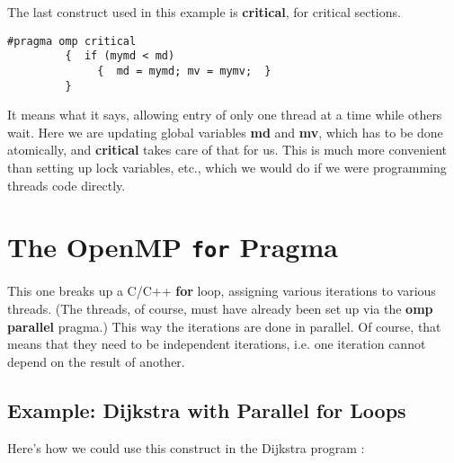 The last construct used in this example is {\bf critical}, for critical
sections.

\begin{Verbatim}[fontsize=\relsize{-2}]
         #pragma omp critical
         {  if (mymd < md)
              {  md = mymd; mv = mymv;  }
         }
\end{Verbatim}

It means what it says, allowing entry of only one thread at a time while
others wait.  Here we are updating global variables {\bf md} and {\bf
mv}, which has to be done atomically, and {\bf critical} takes care of
that for us.  This is much more convenient than setting up lock
variables, etc., which we would do if we were programming threads code
directly.

\section{The OpenMP {\tt for} Pragma}

This one breaks up a C/C++ {\bf for} loop, assigning various iterations
to various threads.  (The threads, of course, must have already been set
up via the {\bf omp parallel} pragma.) This way the iterations are done
in parallel.  Of course, that means that they need to be independent
iterations, i.e. one iteration cannot depend on the result of another.

\subsection{Example:  Dijkstra with Parallel for Loops}
\label{basic}

Here's how we could use this construct in the Dijkstra program :

